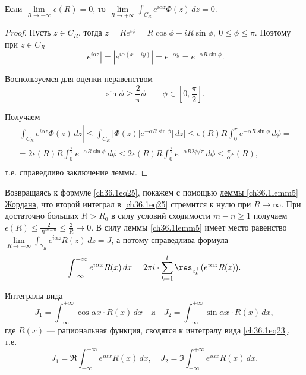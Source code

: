 \begin{leftbar}
\begin{lemm} [Жордана]
Если $\lim\limits_{R \to +\infty} \epsilon(R) = 0$, то $\lim\limits_{R \to +\infty} \int_{C_R} e^{i \alpha z} \Phi(z) \,dz = 0$.
\end{lemm}

\begin{proof}
Пусть $z \in C_R$, тогда $z = Re^{i\phi} = R\cos\phi + iR\sin\phi, \: 0 \le \phi \le \pi$. Поэтому при $z \in C_R$
$$
|e^{i \alpha z}| = |e^{i \alpha(x + iy)}| = e^{-\alpha y} = e^{- \alpha R \sin\phi}.
$$

Воспользуемся для оценки неравенством
\begin{equation} \label{ch36.1eq26}
\sin \phi \ge \frac{2}{\pi}\phi \quad \text{} \quad \phi \in \left[ 0, \frac{\pi}{2}\right].
\end{equation}

Получаем
\begin{multline*}
\left| \int_{C_R} e^{i \alpha z} \Phi(z)\,dz \right| \le \int_{C_R} |\Phi(z)|e^{-\alpha R \sin \phi}|\,dz| \le \epsilon(R)R \int_0^\pi e^{-\alpha R \sin\phi} \,d\phi =\\= 2\epsilon(R)R \int_0^{\frac{\pi}{2}} e^{-\alpha R \sin\phi} \,d\phi \le 2\epsilon(R)R \int_0^{\frac{\pi}{2}} e^{-\alpha R 2\phi / \pi} \,d\phi \le \frac{\pi}{\alpha} \epsilon(R),\\
\end{multline*}
т.е. справедливо заключение леммы.
\end{proof}

Возвращаясь к формуле \eqref{ch36.1eq25}, покажем с помощью \hyperref[ch36.1lemm5]{леммы \ref{ch36.1lemm5} Жордана}, что второй интеграл в \eqref{ch36.1eq25} стремится к нулю при $R \to \infty$. При достаточно больших $R > R_0$ в силу условий сходимости $m - n \ge 1$ получаем $\epsilon(R) \le \frac{2}{R^{m - n}} \le \frac{2}{R} \to 0$. В силу леммы  \ref{ch36.1lemm5} имеет место равенство $\lim\limits_{R \to +\infty} \int_{\gamma_R} e^{i \alpha z}R(z) \,dz = J$, а потому справедлива формула
\begin{equation} \label{ch36.1eq27}
\int_{-\infty}^{+\infty} e^{i \alpha x}R(x) \,dx = 2\pi i \cdot \sum_{k = 1}^l \res_{z_k^+} (e^{i \alpha z}R(z)).
\end{equation}

\begin{cons} \label{ch36.1cons2}
Интегралы вида
\begin{equation} \label{ch36.1eq28}
J_1 = \int_{-\infty}^{+\infty} \cos\alpha x \cdot R(x) \,dx \quad \text{и} \quad J_2 = \int_{-\infty}^{+\infty} \sin \alpha x \cdot R(x) \,dx,
\end{equation}
где $R(x)$ --- рациональная функция, сводятся к интегралу вида \eqref{ch36.1eq23}, т.е.
$$
J_1 = \Re \int_{-\infty}^{+\infty} e^{i \alpha x} R(x) \,dx, \quad J_2 = \Im \int_{-\infty}^{+\infty} e^{i \alpha x}R(x) \,dx.
$$
\end{cons}
\end{leftbar}